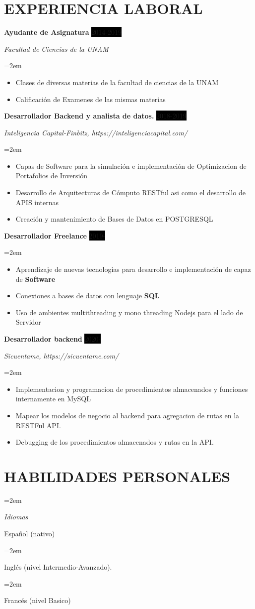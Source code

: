 \documentclass[paper=a4,fontsize=11pt]{scrartcl} %
\newlength{\spacebox}
\newcommand{\sepspace}{\vspace*{1em}}		%
\newcommand{\NewPart}[1]{\section*{\uppercase{#1}}}
\newcommand{\PersonalEntry}[2]{
		\noindent\hangindent=2em\hangafter=0 %
		\parbox{\spacebox}{        %
		\textit{#1}}		       %
		\hspace{1.5em} #2 \par}    %
\newcommand{\SkillsEntry}[2]{      %
		\noindent\hangindent=2em\hangafter=0 %
		\parbox{\spacebox}{        %
		\textit{#1}}			   %
		\hspace{1.5em} #2 \par}    %
\newcommand{\EducationEntry}[4]{
		\noindent \textbf{#1} \hfill      %
		\colorbox{White}{%
			\parbox{5cm}{%
			\hfill\color{Black}#2}} \par  %
		\noindent \textit{#3} \par        %
		\noindent\hangindent=2em\hangafter=0 \small #4 %
		\normalsize \par}
\newcommand{\WorkEntry}[4]{				  %
		\noindent \textbf{#1} \hfill      %
		\noindent\colorbox{Black}{\color{White}#2} \par  %
		\noindent \textit{#3} \par              %
		\noindent\hangindent=2em\hangafter=0 \small #4 %
		\normalsize \par}
\begin{document}
\NewPart{Experiencia laboral}{}
\WorkEntry{Ayudante de Asignatura}{2014-2019}{Facultad de Ciencias de la UNAM}{
\begin{itemize}
	\item Clases de diversas materias de la facultad de ciencias de la UNAM
	\item Calificación de Examenes de las mismas materias
\end{itemize}
}
\WorkEntry{Desarrollador Backend y analista de datos.}{2018-2019}{Inteligencia Capital-Finbitz, https://inteligenciacapital.com/}{
\begin{itemize}
\item{Capas de Software para la simulación e implementación de Optimizacion de Portafolios de Inversión}
\item{Desarrollo de Arquitecturas de Cómputo RESTful asi como el desarrollo de APIS internas}
\item{Creación y mantenimiento de Bases de Datos en POSTGRESQL}
\end{itemize}
}
\WorkEntry{Desarrollador Freelance}{2019-}{}{
\begin{itemize}
	\item{Aprendizaje de nuevas tecnologias para desarrollo e implementación de capaz de \textbf{Software}}
	\item{Conexiones a bases de datos con lenguaje \textbf{SQL}}
	\item {Uso de ambientes multithreading y mono threading Nodejs para el lado de Servidor}
\end{itemize}
}
\WorkEntry{Desarrollador backend}{2020-}{Sicuentame, https://sicuentame.com/}{
\begin{itemize}
	\item{Implementacion y programacion de procedimientos almacenados y funciones internamente en MySQL}
	\item {Mapear los modelos de negocio al backend para agregacion de rutas en la RESTFul API.}
	\item {Debugging de los procedimientos almacenados y rutas en la API.}
\end{itemize}
}
\sepspace


\NewPart{Habilidades personales}{}

\SkillsEntry{Idiomas}{Español (nativo)}
\SkillsEntry{}{Inglés (nivel Intermedio-Avanzado).}
\SkillsEntry{}{Francés (nivel Basico)}
\end{document}
